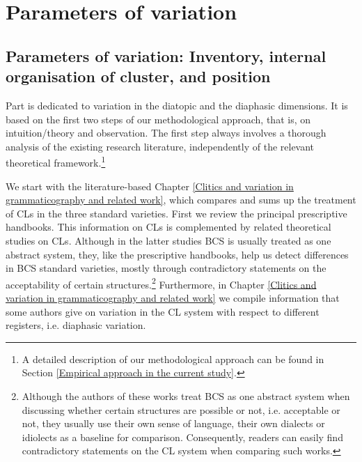 \part{Parameters of  variation}
\label{part2}
\chapter[Parameters of variation]{Parameters of variation: Inventory, internal organisation of cluster, and position}
\label{Parameters of variation: Inventory, internal organisation of cluster and position}




	Part \ref{part2} is dedicated to variation in the diatopic and the diaphasic dimensions. It is based on the first two steps of our methodological approach, that is, on intuition/theory and observation. The first step always involves a thorough analysis of the existing research literature, independently of the relevant theoretical framework.\footnote{A detailed description of our methodological approach can be found in Section \ref{Empirical approach in the current study}.}  



	We start with the literature-based Chapter \ref{Clitics and variation in grammaticography and related work}, which compares and sums up the treatment of CLs in the three standard varieties. First we review the principal prescriptive handbooks. This information on CLs is complemented by related theoretical studies on CLs. Although in the latter studies BCS is usually treated as one abstract system, they, like the prescriptive handbooks, help us detect differences in BCS standard varieties, mostly through contradictory statements on the acceptability of certain structures.\footnote{Although the authors of these works treat BCS as one abstract system when discussing whether certain structures are possible or not, i.e. acceptable or not, they usually use their own sense of language, their own dialects or idiolects as a baseline for comparison. Consequently, readers can easily find contradictory statements on the CL system when comparing such works.} Furthermore, in Chapter \ref{Clitics and variation in grammaticography and related work} we compile information that some authors give on variation in the CL system with respect to different registers, i.e. diaphasic variation. 



